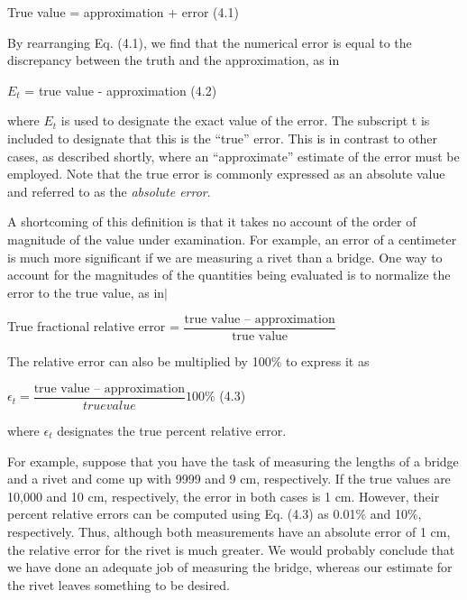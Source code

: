 \documentclass[../main.tex]{subfiles}
\begin{document}
True value = approximation + error
\hfill
(4.1)
\newline

\noindent
By rearranging Eq. (4.1), we find that the numerical error is equal to the discrepancy
between the truth and the approximation, as in
\newline

$E_t$ = true value - approximation
\hfill
(4.2)
\newline

\noindent
where $E_t$ is used to designate the exact value of the error. The subscript t is included to designate
that this is the ``true'' error. This is in contrast to other cases, as described shortly,
where an ``approximate'' estimate of the error must be employed. Note that the true error is
commonly expressed as an absolute value and referred to as the \emph{absolute error}.

A shortcoming of this definition is that it takes no account of the order of magnitude of
the value under examination. For example, an error of a centimeter is much more significant if we are measuring a rivet than a bridge. One way to account for the magnitudes of the
quantities being evaluated is to normalize the error to the true value, as in$\mid$
\newline

True fractional relative error = $\dfrac{\text{true value -- approximation}}{\text{true value}}$
\newline

\noindent
The relative error can also be multiplied by 100\% to express it as
\newline

$\epsilon_t = \dfrac{\text{true value -- approximation}}{true value} 100\%$
\hfill
(4.3)
\newline

\noindent
where $\epsilon_t$ designates the true percent relative error.

For example, suppose that you have the task of measuring the lengths of a bridge and
a rivet and come up with 9999 and 9 cm, respectively. If the true values are 10,000 and
10 cm, respectively, the error in both cases is 1 cm. However, their percent relative errors
can be computed using Eq. (4.3) as 0.01\% and 10\%, respectively. Thus, although both measurements
have an absolute error of 1 cm, the relative error for the rivet is much greater. We
would probably conclude that we have done an adequate job of measuring the bridge,
whereas our estimate for the rivet leaves something to be desired.
\end{document}
